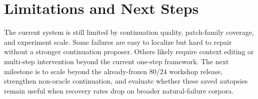 \documentclass{article}
\begin{document}
\section{Limitations and Next Steps}

The current system is still limited by continuation quality, patch-family
coverage, and experiment scale. Some failures are easy to localize but hard to
repair without a stronger continuation proposer. Others likely require context
editing or multi-step intervention beyond the current one-step framework. The
next milestone is to scale beyond the already-frozen $80$/$24$ workshop
release, strengthen non-oracle continuation, and evaluate whether these saved
autopsies remain useful when recovery rates drop on broader natural-failure
corpora.



\end{document}
